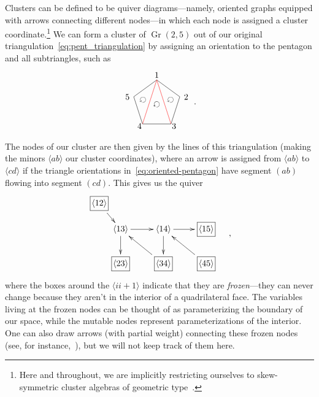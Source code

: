 \documentclass[11pt]{article}
\DeclareMathOperator{\Gr}{Gr}
\def\ket#1{\langle #1 \rangle}
\def\drawLabeledPentagon{
\coordinate (P1) at (90:1);
\coordinate (P2) at (18:1);
\coordinate (P3) at (306:1);
\coordinate (P4) at (234:1);
\coordinate (P5) at (162:1);
\draw (P1) -- (P2) -- (P3) -- (P4) -- (P5) -- cycle;
\draw (0,1.2) node {1};
\draw (1,.3) node[anchor=west] {2};
\draw (.5,-.9) node[anchor=west] {3};
\draw (-.5,-.9) node[anchor=east] {4};
\draw (-1,.3) node[anchor=east] {5};
}
\begin{document}
Clusters can be defined to be quiver diagrams---namely, oriented graphs equipped with arrows connecting different nodes---in which each node is assigned a cluster coordinate.\footnote{Here and throughout, we are implicitly restricting ourselves to skew-symmetric cluster algebras of geometric type~\cite{}.} We can form a cluster of $\Gr(2,5)$ out of our original triangulation~\eqref{eq:pent_triangulation} by assigning an orientation to the pentagon and all subtriangles, such as
\begin{equation}\label{eq:oriented-pentagon}
\begin{gathered}
\begin{tikzpicture}
  \drawLabeledPentagon
  \draw[color=red] (P1) -- (P3);
  \draw[color=red] (P1) -- (P4);
  \draw (18:.6) node[rotate=144] {$\circlearrowleft$};
  \draw (0:0) node[rotate=144] {$\circlearrowleft$};
  \draw (162:.6) node[rotate=144] {$\circlearrowleft$};
\end{tikzpicture} 
\end{gathered} \ .
\end{equation}
The nodes of our cluster are then given by the lines of this triangulation (making the minors $\ket{ab}$ our cluster coordinates), where an arrow is assigned from $\ket{ab}$ to $\ket{cd}$ if the triangle orientations in~\eqref{eq:oriented-pentagon} have segment $(ab)$ flowing into segment $(cd)$. This gives us the quiver
\begin{equation}\label{eq:gr25-seed}
\begin{gathered}
\begin{xy} 0;<1pt,0pt>:<0pt,-1pt>::
	(25,30) *+{\langle 13\rangle} ="0",
	(75,30) *+{\langle 14\rangle} ="1",
	(125,30) *+{\framebox[5ex]{$\langle 15\rangle$}} ="2",
	(125,70) *+{\framebox[5ex]{$\langle 45\rangle$}} ="3",
	(75,70) *+{\framebox[5ex]{$\langle 34\rangle$}} ="4",
	(25,70) *+{\framebox[5ex]{$\langle 23\rangle$}} ="5",
	(0,0) *+{\framebox[5ex]{$\langle 12\rangle$}} ="6",
	(145,75) *+{},
	"0", {\ar"1"},
	"4", {\ar"0"},
	"0", {\ar"5"},
	"6", {\ar"0"},
	"1", {\ar"2"},
	"3", {\ar"1"},
	"1", {\ar"4"},
\end{xy}
\end{gathered} \ ,
\end{equation}
where the boxes around the $\ket{ii+1}$ indicate that they are \emph{frozen}---they can never change because they aren't in the interior of a quadrilateral face. The variables living at the frozen nodes can be thought of as parameterizing the boundary of our space, while the mutable nodes represent parameterizations of the interior. One can also draw arrows (with partial weight) connecting these frozen nodes (see, for instance,~\cite{ArkaniHamed:2012nw}), but we will not keep track of them here. 
\end{document}
